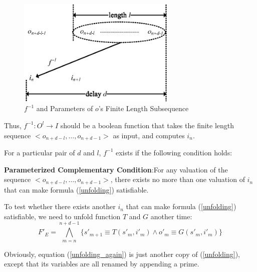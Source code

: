 \documentclass[journal]{IEEEtran}
\begin{document}
\begin{figure}[t]
\centering
\includegraphics[width=3in]{dl}
\caption{$f^{-1}$ and Parameters of $o$'s Finite Length Subsequence }
\label{dl}
\end{figure}

Thus,
$f^{-1}:O^l\to I$ should be a boolean function that takes the finite length sequence $<o_{n+d-l},\dots , o_{n+d-1} >$ as input,
and computes $i_n$.

For a particular pair of $d$ and $l$,
$f^{-1}$ exists if the following condition holds:

\vspace{0.2cm}

\begin{definition11}\label{UniquenessAssumption}
\textbf{Parameterized Complementary Condition}:For any valuation of the sequence $<o_{n+d-l},\dots , o_{n+d-1} >$,
there exists no more than one valuation of $i_n$
that can make formula (\ref{unfolding}) satisfiable.
\end{definition11}

\vspace{0.2cm}

To test whether there exists another $i_n$ that can make formula (\ref{unfolding}) satisfiable,
we need to unfold function $T$ and $G$ another time:
\begin{equation}\label{unfolding_again}
F'_{E}= \bigwedge_{m=n}^{n+d-1} \Big\{ s'_{m+1}\equiv T(s'_m,i'_m) \wedge  o'_m\equiv G(s'_m,i'_m) \Big\}
\end{equation}

Obviously,
equation (\ref{unfolding_again}) is just another copy of (\ref{unfolding}),
except that its variables are all renamed by appending a prime.
\end{document}

